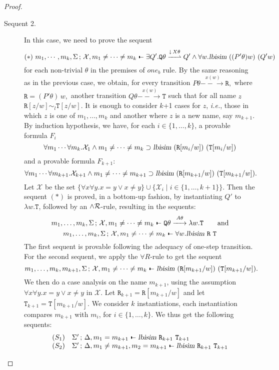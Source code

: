 \documentclass{acmtrans2m}
\newcommand{\ie}{{\em i.e.}}
\def\Xscr{{\mathcal X}}
\def\Qpi{{\mathtt Q}}
\def\Rpi{{\mathtt R}}
\def\Tpi{{\mathtt T}}
\def\relbar{\mathrel{\smash-}}
\def\joinrelm{\mathrel{\mkern-3.2mu}}
\def\tailpiece{\kern 1pt\vrule height 1ex width 0.3ex depth -.25ex}
\def\seqsym{\mathrel{\tailpiece\joinrelm\relbar}}
\newcommand{\NSeq}[3]{#1\,;\,#2 \seqsym #3}
\newcommand{\lbisim}[2]{\hbox{\sl lbisim}~#1~#2}
\newcommand{\inact}{\mathop{\downarrow}}
\newcommand{\landR}{\land{\cal R}}
\newcommand{\oimp}{\supset}
\newcommand{\one  }[3]{#1\stackrel{#2}{-\!\!-\!\!\!\rightarrow    } #3}
\newcommand{\onep }[3]{#1\stackrel{#2}{-\!\!-\!\!\!\rightharpoonup} #3}
\begin{document}
\begin{proof}
\begin{description}
\item[Sequent 2.]
In this case, we need to prove the sequent
$$
(*) ~ \NSeq{m_1, \cdots, m_k, \Sigma}{\Xscr, m_1 \not = \cdots \not = m_k}{\exists Q'. \onep{\Qpi\theta}{\inact {X\theta}}{Q'}
\land \forall w. \lbisim{((P'\theta) w)}{(Q' w)}}
$$
for each non-trivial $\theta$ in the premises of $one_b$ rule. 
By the same reasoning as in the previous case, we obtain, for every transition
$
\one{P\theta}{x(w)}{\Rpi},
$
where $\Rpi = (P'\theta)\,w,$ another transition
$
\one{Q\theta}{x(w)}{\Tpi}
$
such that for all name $z$
$
\Rpi[z/w] \sim_l  \Tpi[z/w].
$
It is enough to consider $k$+1 cases for $z$, \ie, those in which
$z$ is one of $m_1, \ldots, m_k$ and another where $z$ is a new name,
say $m_{k+1}.$
By induction hypothesis, we have, for each $i \in \{1,\ldots, k\}$, a provable formula
$F_i$
$$
\forall m_1 \cdots \forall m_{k}. \Xscr_1 \land m_1 \not = \cdots \not = m_{k} \oimp
\lbisim{(\Rpi[m_i/w])}{(\Tpi[m_i/w])}
$$
and a provable formula $F_{k+1}$:
$$
\forall m_1 \cdots \forall m_{k+1}. \Xscr_{k+1} \land m_1 \not = \cdots \not = m_{k+1} \oimp
\lbisim{(\Rpi[m_{k+1}/w])}{(\Tpi[m_{k+1}/w])}.
$$
Let $\Xscr$ be the set
$
\{\forall x \forall y. x = y \lor x \not = y \}  \cup 
\{\Xscr_i \mid i \in \{1,\ldots,k+1\}  \}. 
$
Then the sequent $(*)$ is proved, in a bottom-up fashion, by instantiating $Q'$ to $\lambda w. \Tpi$,
followed by an $\landR$-rule, resulting in the sequents:
$$
\NSeq{m_1, \ldots, m_k, \Sigma}{\Xscr, m_1 \not = \cdots \not = m_k}{\one{\Qpi \theta}{A\theta}{\lambda w.\Tpi}} 
\hbox{\qquad and}
$$
$$
\NSeq{m_1, \ldots, m_k, \Sigma}{\Xscr, m_1 \not = \cdots \not = m_k}{\forall w. \lbisim{\Rpi}{\Tpi}} 
$$
The first sequent is provable following the adequacy of one-step transition.
For the second sequent, we apply the $\forall R$-rule to get the sequent
$$
\NSeq{m_1, \ldots, m_k, m_{k+1}, \Sigma}{\Xscr, m_1 \not = \cdots \not = m_k}
   {\lbisim{(\Rpi[m_{k+1}/w])}{(\Tpi[m_{k+1}/w])}}. 
$$
We then do a case analysis on the name $m_{k+1}$, using the assumption
$\forall x\forall y. x = y \lor x \not = y$ in $\Xscr.$ 
Let $\Rpi_{k+1} = \Rpi[m_{k+1}/w]$ and let $\Tpi_{k+1} = \Tpi[m_{k+1}/w].$
We consider $k$ instantiations, each instantiation compares $m_{k+1}$
with $m_i$, for $i \in \{1,\dots, k\}.$ We thus get the following sequents:
$$
\begin{array}{ll}
(S_1) & \NSeq{\Sigma'}{\Delta, m_1 = m_{k+1}}
   {\lbisim{\Rpi_{k+1}}{\Tpi_{k+1}}} \\
(S_2) & \NSeq{\Sigma'}{\Delta, m_1 \not = m_{k+1}, m_2 = m_{k+1}} {\lbisim{\Rpi_{k+1}}{\Tpi_{k+1}}} \\

\end{array}$$
\end{description}
\end{proof}
\end{document}
